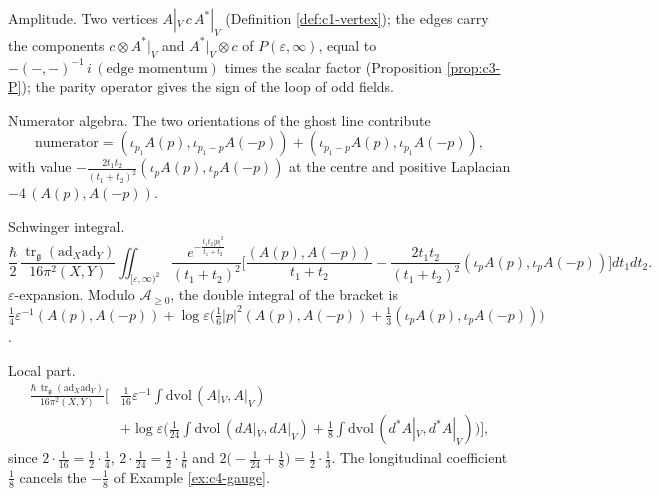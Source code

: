 \begin{example}
\label{ex:c4-ghost}
Amplitude. Two vertices $A|_V\,c\,A^*|_V$ (Definition \ref{def:c1-vertex}); the edges carry the components $c\otimes A^*|_V$ and $A^*|_V\otimes c$ of $P(\varepsilon,\infty)$, equal to $-(-,-)^{-1}\,i\,(\text{edge momentum})$ times the scalar factor (Proposition \ref{prop:c3-P}); the parity operator gives the sign of the loop of odd fields.

Numerator algebra. The two orientations of the ghost line contribute
\[
\text{numerator}=(\iota_{p_1}A(p),\iota_{p_1-p}A(-p))+(\iota_{p_1-p}A(p),\iota_{p_1}A(-p)),
\]
with value $-\frac{2t_1t_2}{(t_1+t_2)^2}(\iota_pA(p),\iota_pA(-p))$ at the centre and positive Laplacian $-4\,(A(p),A(-p))$.

Schwinger integral.
\[
\frac\hbar2\,\frac{\operatorname{tr}_{\mathfrak g}(\mathrm{ad}_X\mathrm{ad}_Y)}{16\pi^2(X,Y)}\iint_{[\varepsilon,\infty)^2}\frac{e^{-\frac{t_1t_2|p|^2}{t_1+t_2}}}{(t_1+t_2)^2}\Big[\frac{(A(p),A(-p))}{t_1+t_2}-\frac{2t_1t_2}{(t_1+t_2)^2}(\iota_pA(p),\iota_pA(-p))\Big]dt_1dt_2 .
\]
$\varepsilon$-expansion. Modulo $\mathscr A_{\ge0}$, the double integral of the bracket is $\tfrac14\varepsilon^{-1}(A(p),A(-p))+\log\varepsilon\big(\tfrac16|p|^2(A(p),A(-p))+\tfrac13(\iota_pA(p),\iota_pA(-p))\big)$.

Local part.
\[
\begin{aligned}
\frac{\hbar\,\operatorname{tr}_{\mathfrak g}(\mathrm{ad}_X\mathrm{ad}_Y)}{16\pi^2(X,Y)}\Big[&\tfrac1{16}\varepsilon^{-1}\int\mathrm{dvol}\,(A|_V,A|_V)\\
&+\log\varepsilon\Big(\tfrac1{24}\int\mathrm{dvol}\,(dA|_V,dA|_V)+\tfrac18\int\mathrm{dvol}\,(d^*A|_V,d^*A|_V)\Big)\Big],
\end{aligned}
\]
since $2\cdot\tfrac1{16}=\tfrac12\cdot\tfrac14$, $2\cdot\tfrac1{24}=\tfrac12\cdot\tfrac16$ and $2\big(-\tfrac1{24}+\tfrac18\big)=\tfrac12\cdot\tfrac13$. The longitudinal coefficient $\tfrac18$ cancels the $-\tfrac18$ of Example \ref{ex:c4-gauge}.
\end{example}

